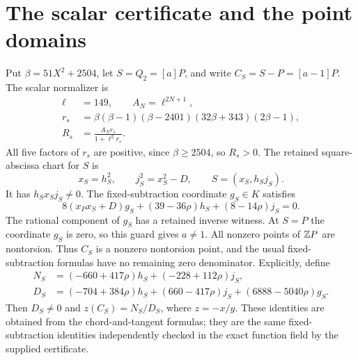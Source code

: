 \documentclass[11pt,a4paper]{article}
\begin{document}
\section{The scalar certificate and the point domains}\label{sec:scalar}
Put $\beta=51X^2+2504$, let $S=Q_2=[a]P$, and write
$C_S=S-P=[a-1]P$. The scalar normalizer is
\begin{equation}\label{eq:scalarnormalizer}
 \begin{split}
 \ell&=149,\qquad A_N=\ell^{2N+1},\\
 r_s&=\beta(\beta-1)(\beta-2401)(32\beta+343)(2\beta-1),\\
 R_s&=\frac{A_Nr_s}{1+\ell^2r_s}.
 \end{split}
\end{equation}
All five factors of $r_s$ are positive, since $\beta\ge2504$, so
$R_s>0$. The retained square-abscissa chart for $S$ is
\[
 x_S=h_S^2,\qquad j_S^2=x_S^2-D,
 \qquad S=(x_S,h_Sj_S).
\]
It has $h_Sx_Sj_S\ne0$. The fixed-subtraction coordinate $g_S\in K$
satisfies
\[
 8(x_Px_S+D)g_S+(39-36\rho)h_S+(8-14\rho)j_S=0.
\]
The rational component of $g_S$ has a retained inverse witness.
At $S=P$ the coordinate $g_S$ is zero, so this guard gives $a\ne1$.
All nonzero points of $\mathbb Z P$ are nontorsion. Thus $C_S$ is a nonzero
nontorsion point, and the usual fixed-subtraction formulas have no
remaining zero denominator. Explicitly, define
\[
 \begin{split}
 N_S&=(-660+417\rho)h_S+(-228+112\rho)j_S,\\
 D_S&=(-704+384\rho)h_S+(660-417\rho)j_S
                         +(6888-5040\rho)g_S.
 \end{split}
\]
Then $D_S\ne0$ and $z(C_S)=N_S/D_S$, where $z=-x/y$.
These identities are obtained from the chord-and-tangent formulas;
they are the same fixed-subtraction identities independently checked
in the exact function field by the supplied certificate.
\end{document}
